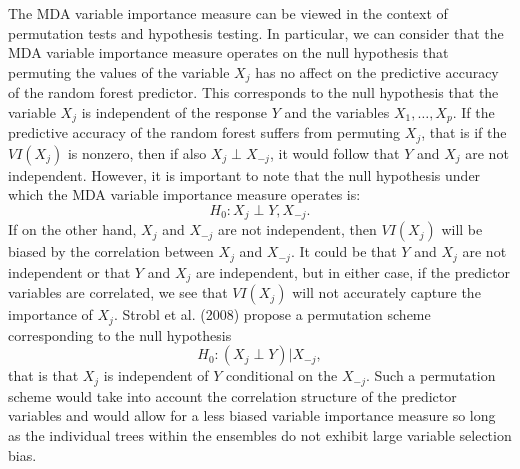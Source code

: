 \documentclass[12pt,twoside]{reedthesis}
\theoremstyle{definition}
\theoremstyle{definition}
\theoremstyle{definition}
\theoremstyle{remark}
\begin{document}
The MDA variable importance measure can be viewed in the context of
permutation tests and hypothesis testing. In particular, we can consider
that the MDA variable importance measure operates on the null hypothesis
that permuting the values of the variable \(X_j\) has no affect on the
predictive accuracy of the random forest predictor. This corresponds to
the null hypothesis that the variable \(X_j\) is independent of the
response \(Y\) and the variables \(X_1,\ldots,X_p\). If the predictive
accuracy of the random forest suffers from permuting \(X_j\), that is if
the \(VI(X_j)\) is nonzero, then if also \(X_j\perp X_{-j}\), it would
follow that \(Y\) and \(X_j\) are not independent. However, it is
important to note that the null hypothesis under which the MDA variable
importance measure operates is: \[H_0:X_j \perp Y,X_{-j}.\] If on the
other hand, \(X_j\) and \(X_{-j}\) are not independent, then \(VI(X_j)\)
will be biased by the correlation between \(X_j\) and \(X_{-j}\). It
could be that \(Y\) and \(X_j\) are not independent or that \(Y\) and
\(X_j\) are independent, but in either case, if the predictor variables
are correlated, we see that \(VI(X_j)\) will not accurately capture the
importance of \(X_j\). Strobl et al. (2008) propose a permutation scheme
corresponding to the null hypothesis \[H_0:(X_j\perp Y)|X_{-j},\] that
is that \(X_j\) is independent of \(Y\) conditional on the \(X_{-j}\).
Such a permutation scheme would take into account the correlation
structure of the predictor variables and would allow for a less biased
variable importance measure so long as the individual trees within the
ensembles do not exhibit large variable selection bias. \par
\end{document}
